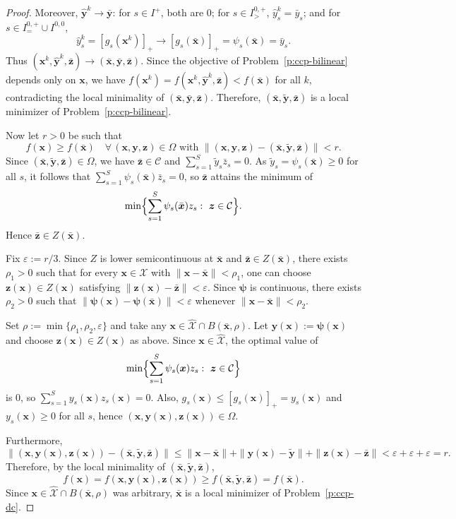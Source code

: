 \documentclass[11pt]{article}
\def\bs{\boldsymbol}
\def\C{\mathcal{C}}
\def\X{\mathcal{X}}
\begin{document}
\begin{proof}
Moreover, $\hat{\bs{y}}^k\to\bar{\bs{y}}$: for $s\in I^+$, both are $0$; for $s\in I^{0,+}_{>}$,
$\hat y_s^k=\bar y_s$; and for $s\in I^{0,+}_{=}\cup I^{0,0}$,
\[
\hat y_s^k=[g_s(\bs{x}^k)]_+\to[g_s(\bar{\bs{x}})]_+=\psi_s(\bar{\bs{x}})=\bar y_s.
\]
Thus $(\bs{x}^k,\hat{\bs{y}}^k,\bar{\bs{z}})\to(\bar{\bs{x}},\bar{\bs{y}},\bar{\bs{z}})$.
Since the objective of Problem~\eqref{p:ccp-bilinear} depends only on $\bs{x}$, we have
$f(\bs{x}^k)=f(\bs{x}^k,\hat{\bs{y}}^k,\bar{\bs{z}})<f(\bar{\bs{x}})$ for all $k$, contradicting the local
minimality of $(\bar{\bs{x}},\bar{\bs{y}},\bar{\bs{z}})$. Therefore,
$(\bar{\bs{x}},\tilde{\bs{y}},\bar{\bs{z}})$ is a local minimizer of Problem~\eqref{p:ccp-bilinear}.

Now let $r>0$ be such that
\[
f(\bs{x})\ge f(\bar{\bs{x}})
\quad \forall\,(\bs{x},\bs{y},\bs{z})\in\Omega
\text{ with }
\|(\bs{x},\bs{y},\bs{z})-(\bar{\bs{x}},\tilde{\bs{y}},\bar{\bs{z}})\|<r.
\]
Since $(\bar{\bs{x}},\tilde{\bs{y}},\bar{\bs{z}})\in\Omega$, we have
$\bar{\bs{z}}\in\C$ and $\sum_{s=1}^S\tilde{y}_s\bar{z}_s=0$. As
$\tilde{y}_s=\psi_s(\bar{\bs{x}})\ge 0$ for all $s$, it follows that
$\sum_{s=1}^S\psi_s(\bar{\bs{x}})\bar{z}_s=0$, so $\bar{\bs{z}}$ attains the minimum of
\[
\min\Bigl\{\sum_{s=1}^S\psi_s(\bar{\bs{x}})z_s:\ \bs{z}\in\C\Bigr\}.
\]
Hence $\bar{\bs{z}}\in Z(\bar{\bs{x}})$.

Fix $\varepsilon:=r/3$. Since $Z$ is lower semicontinuous at $\bar{\bs{x}}$ and
$\bar{\bs{z}}\in Z(\bar{\bs{x}})$, there exists $\rho_1>0$ such that for every
$\bs{x}\in\X$ with $\|\bs{x}-\bar{\bs{x}}\|<\rho_1$, one can choose
$\bs{z}(\bs{x})\in Z(\bs{x})$ satisfying $\|\bs{z}(\bs{x})-\bar{\bs{z}}\|<\varepsilon$.
Since $\bs{\psi}$ is continuous, there exists $\rho_2>0$ such that
$\|\bs{\psi}(\bs{x})-\bs{\psi}(\bar{\bs{x}})\|<\varepsilon$ whenever
$\|\bs{x}-\bar{\bs{x}}\|<\rho_2$.

Set $\rho:=\min\{\rho_1,\rho_2,\varepsilon\}$ and take any
$\bs{x}\in\hat{\X}\cap B(\bar{\bs{x}},\rho)$. Let $\bs{y}(\bs{x}):=\bs{\psi}(\bs{x})$ and choose
$\bs{z}(\bs{x})\in Z(\bs{x})$ as above. Since $\bs{x}\in\hat{\X}$, the optimal value of
\[
\min\Bigl\{\sum_{s=1}^S\psi_s(\bs{x})z_s:\ \bs{z}\in\C\Bigr\}
\]
is $0$, so $\sum_{s=1}^S y_s(\bs{x})z_s(\bs{x})=0$. Also,
$g_s(\bs{x})\le[g_s(\bs{x})]_+=y_s(\bs{x})$ and $y_s(\bs{x})\ge 0$ for all $s$, hence
$(\bs{x},\bs{y}(\bs{x}),\bs{z}(\bs{x}))\in\Omega$.

Furthermore,
\[
\|(\bs{x},\bs{y}(\bs{x}),\bs{z}(\bs{x}))-(\bar{\bs{x}},\tilde{\bs{y}},\bar{\bs{z}})\|
\le \|\bs{x}-\bar{\bs{x}}\|+\|\bs{y}(\bs{x})-\tilde{\bs{y}}\|+\|\bs{z}(\bs{x})-\bar{\bs{z}}\|
<\varepsilon+\varepsilon+\varepsilon=r.
\]
Therefore, by the local minimality of $(\bar{\bs{x}},\tilde{\bs{y}},\bar{\bs{z}})$,
\[
f(\bs{x})=f(\bs{x},\bs{y}(\bs{x}),\bs{z}(\bs{x}))
\ge f(\bar{\bs{x}},\tilde{\bs{y}},\bar{\bs{z}})
= f(\bar{\bs{x}}).
\]
Since $\bs{x}\in\hat{\X}\cap B(\bar{\bs{x}},\rho)$ was arbitrary, $\bar{\bs{x}}$ is a local minimizer of
Problem~\eqref{p:ccp-dc}.
\end{proof}
\end{document}
